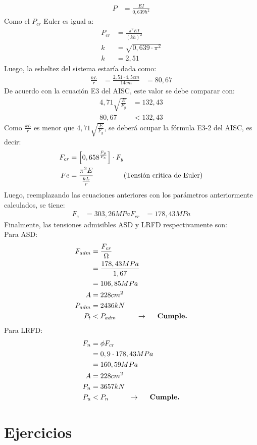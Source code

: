 \begin{example}
\begin{align*}
    P&=\frac{EI}{0,639h^2}
\end{align*}
Como el $P_{cr}$ Euler es igual a:
\begin{align*}
    P_{cr} &= \frac{\pi^2 EI}{(kh)^2}\\
    k &= \sqrt{0,639\cdot\pi^2}\\
    k &= 2,51
\end{align*}
Luego, la esbeltez del sistema estaría dada como:
\begin{align*}
    \frac{kL}{r}&=\frac{2,51\cdot 4,5cm}{14cm}
    &=80,67
\end{align*}
De acuerdo con la ecuación E3 del AISC, este valor se debe comparar con:
\begin{align*}
    4,71\sqrt{\frac{E}{F_y}}&=132,43\\
    80,67&<132,43
\end{align*}
Como $\frac{kL}{r}$ es menor que $4,71\sqrt{\frac{E}{F_y}}$, se deberá ocupar la fórmula E3-2 del AISC, es decir:
\begin{align*}
    F_{cr}&=\left[0,658^\frac{F_y}{F_e}\right]\cdot F_y\\
    Fe&=\frac{\pi^2 E}{\frac{kL}{r}} \text{\hspace{15mm}(Tensión crítica de Euler)}
\end{align*}
Luego, reemplazando las ecuaciones anteriores con los parámetros anteriormente calculados, se tiene:
\begin{align*}
    F_e&=303,26 MPa
    F_{cr}&=178,43 MPa
\end{align*}
Finalmente, las tensiones admisibles ASD y LRFD respectivamente son:\\
Para ASD:\\
 \begin{align*}
     F_{adm}&=\frac{F_{cr}}{\Omega}\\
     &=\frac{178,43 MPa}{1,67}\\
     &=106,85 MPa\\
     A&=228cm^2\\
     P_{adm}&=2436kN\\
     P_{t}&<P_{adm}\hspace{10mm} \rightarrow\textbf{\hspace{5mm}Cumple.}
 \end{align*}
Para LRFD:\\
 \begin{align*}
     F_{n}&=\phi F_{cr}\\
     &=0,9\cdot 178,43 MPa\\
     &=160,59 MPa\\
     A&=228cm^2\\
     P_{n}&=3657kN\\
     P_u&<P_{n}\hspace{10mm} \rightarrow\textbf{\hspace{5mm}Cumple.}
 \end{align*}
\end{example}
\section{Ejercicios}